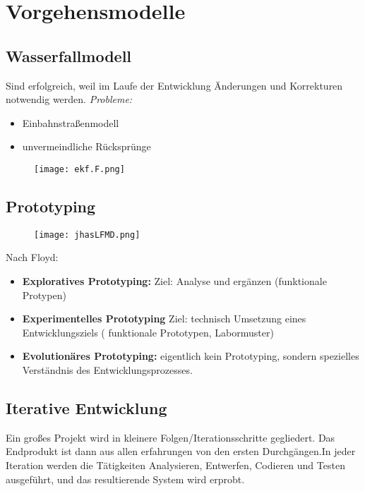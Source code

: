 \documentclass{book}
\begin{document}
    \section{Vorgehensmodelle}
    \subsection{Wasserfallmodell}
    Sind erfolgreich, weil im Laufe der Entwicklung Änderungen und Korrekturen notwendig werden.
    \textit{Probleme:}
    \begin{itemize}
        \item Einbahnstraßenmodell
        \item unvermeindliche Rücksprünge
    \end{itemize}
    \begin{figure}[H]
        \centering
        \texttt{[image: ekf.F.png]}
        \label{fig:enter-label}
    \end{figure}

    \subsection{Prototyping}
    \begin{figure}[H]
        \centering
        \texttt{[image: jhasLFMD.png]}

        \label{fig:enter-label}
    \end{figure}
    Nach Floyd:
    \begin{itemize}
        \item \textbf{Exploratives Prototyping:} Ziel: Analyse und ergänzen (funktionale Protypen)
        \item \textbf{Experimentelles Prototyping} Ziel: technisch Umsetzung eines Entwicklungsziels ( funktionale Prototypen, Labormuster)
        \item \textbf{ Evolutionäres Prototyping:} eigentlich kein Prototyping, sondern spezielles Verständnis des Entwicklungsprozesses.
    \end{itemize}
    \subsection{Iterative Entwicklung}
    Ein großes Projekt wird in kleinere Folgen/Iterationsschritte gegliedert. Das Endprodukt ist dann aus allen erfahrungen von den ersten Durchgängen.In jeder Iteration werden die Tätigkeiten Analysieren, Entwerfen, Codieren und Testen ausgeführt, und das
    resultierende System wird erprobt.
\end{document}
